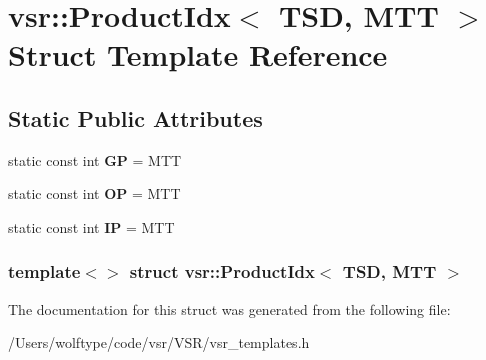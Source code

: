 \hypertarget{structvsr_1_1_product_idx_3_01_t_s_d_00_01_m_t_t_01_4}{\section{vsr\-:\-:Product\-Idx$<$ T\-S\-D, M\-T\-T $>$ Struct Template Reference}
\label{structvsr_1_1_product_idx_3_01_t_s_d_00_01_m_t_t_01_4}
}
\subsection*{Static Public Attributes}
\begin{DoxyCompactItemize}
\item 
\hypertarget{structvsr_1_1_product_idx_3_01_t_s_d_00_01_m_t_t_01_4_ab18357ab0260ff033b061c5780cd94e0}{static const int {\bfseries G\-P} = M\-T\-T}\label{structvsr_1_1_product_idx_3_01_t_s_d_00_01_m_t_t_01_4_ab18357ab0260ff033b061c5780cd94e0}

\item 
\hypertarget{structvsr_1_1_product_idx_3_01_t_s_d_00_01_m_t_t_01_4_a2bd2294f1cc54f8413e62ee09cc134e8}{static const int {\bfseries O\-P} = M\-T\-T}\label{structvsr_1_1_product_idx_3_01_t_s_d_00_01_m_t_t_01_4_a2bd2294f1cc54f8413e62ee09cc134e8}

\item 
\hypertarget{structvsr_1_1_product_idx_3_01_t_s_d_00_01_m_t_t_01_4_aa6bfe0d72468bce56f925da8a88f6519}{static const int {\bfseries I\-P} = M\-T\-T}\label{structvsr_1_1_product_idx_3_01_t_s_d_00_01_m_t_t_01_4_aa6bfe0d72468bce56f925da8a88f6519}

\end{DoxyCompactItemize}
\subsubsection*{template$<$$>$ struct vsr\-::\-Product\-Idx$<$ T\-S\-D, M\-T\-T $>$}



The documentation for this struct was generated from the following file\-:\begin{DoxyCompactItemize}
\item 
/\-Users/wolftype/code/vsr/\-V\-S\-R/vsr\-\_\-templates.\-h\end{DoxyCompactItemize}
